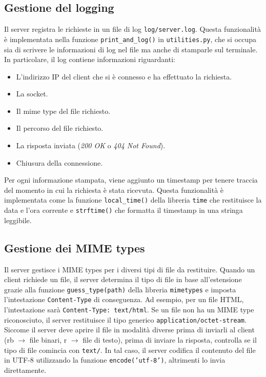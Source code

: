 \documentclass[a4paper,12pt]{report}
\begin{document}
\subsection{Gestione del logging}
\label{sec:gestione-logging}
Il server registra le richieste in un file di log \texttt{log/server.log}. Questa funzionalità è implementata nella funzione \texttt{print\_and\_log()} in \texttt{utilities.py}, che si occupa sia di scrivere le informazioni di log nel file ma anche di stamparle sul terminale.
In particolare, il log contiene informazioni riguardanti:
\begin{itemize}
    \item L'indirizzo IP del client che si è connesso e ha effettuato la richiesta.
    \item La socket.
    \item Il mime type del file richiesto.
    \item Il percorso del file richiesto.
    \item La risposta inviata (\textit{200 OK} o \textit{404 Not Found}).
    \item Chiusura della connessione.
\end{itemize}
Per ogni informazione stampata, viene aggiunto un timestamp per tenere traccia del momento in cui la richiesta è stata ricevuta. Questa funzionalità è implementata come la funzione \texttt{local\_time()} della libreria \texttt{time} che restituisce la data e l'ora corrente e \texttt{strftime()} che formatta il timestamp in una stringa leggibile.

\subsection{Gestione dei MIME types}
\label{sec:mime-types}
Il server gestisce i MIME types per i diversi tipi di file da restituire. Quando un client richiede un file, il server determina il tipo di file in base all'estensione grazie alla funzione \texttt{guess\_type(path)} della libreria \texttt{mimetypes} e imposta l'intestazione \texttt{Content-Type} di conseguenza. Ad esempio, per un file HTML, l'intestazione sarà \texttt{Content-Type: text/html}. Se un file non ha un MIME type riconosciuto, il server restituisce il tipo generico \texttt{application/octet-stream}.
Siccome il server deve aprire il file in modalità diverse prima di inviarli al client (rb $\rightarrow$ file binari, r $\rightarrow$ file di testo), prima di inviare la risposta, controlla se il tipo di file comincia con \texttt{text/}. In tal caso, il server codifica il contenuto del file in UTF-8 utilizzando la funzione \texttt{encode('utf-8')}, altrimenti lo invia direttamente.
\end{document}
